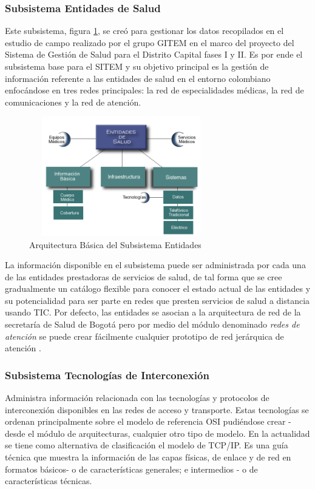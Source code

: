 \subsubsection{Subsistema Entidades de Salud} 
Este subsistema, figura \ref{entidades}, se creó para gestionar los datos recopilados en el estudio de campo realizado por el grupo GITEM en el marco del proyecto del Sistema de Gestión de Salud para el Distrito Capital fases I y II. Es por ende el subsistema base para el SITEM y su objetivo principal es la gestión de información referente a las entidades de salud en el entorno colombiano enfocándose en tres redes principales: la red de especialidades médicas, la red de comunicaciones y la red de atención.

\begin{figure}
 \centering
 \includegraphics[width=80mm, height=52mm]{entidades.png}
 \caption{Arquitectura Básica del Subsistema Entidades}
\label{entidades}
\end{figure}

La información disponible en el subsistema puede ser administrada por cada una de las entidades prestadoras de servicios de salud, de tal forma que se cree gradualmente un catálogo flexible para conocer el estado actual de las entidades y su potencialidad para ser parte en redes que presten servicios de salud a distancia usando TIC. Por defecto, las entidades se asocian a la arquitectura de red de la secretaría de Salud de Bogotá pero por medio del módulo denominado \textit{redes de atención} se puede crear fácilmente cualquier prototipo de red jerárquica de atención \cite{yellowlees}.

\subsubsection{Subsistema Tecnologías de Interconexión} 
Administra información relacionada con las tecnologías y protocolos de interconexión disponibles en las redes de acceso y transporte. Estas tecnologías se ordenan principalmente sobre el modelo de referencia OSI pudiéndose crear  - desde el módulo de arquitecturas, cualquier otro tipo de modelo. En la actualidad se tiene como alternativa de clasificación el modelo de TCP/IP. Es una guía técnica que muestra la información de las capas físicas, de enlace y de red en formatos básicos- o de características generales; e intermedios - o de características técnicas.

